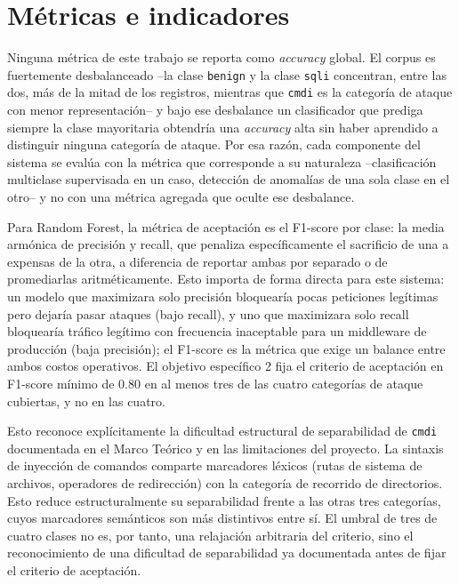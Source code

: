 \section{Métricas e indicadores}

Ninguna métrica de este trabajo se reporta como \textit{accuracy} global. El corpus es fuertemente desbalanceado --la clase \texttt{benign} y la clase \texttt{sqli} concentran, entre las dos, más de la mitad de los registros, mientras que \texttt{cmdi} es la categoría de ataque con menor representación-- y bajo ese desbalance un clasificador que prediga siempre la clase mayoritaria obtendría una \textit{accuracy} alta sin haber aprendido a distinguir ninguna categoría de ataque. Por esa razón, cada componente del sistema se evalúa con la métrica que corresponde a su naturaleza --clasificación multiclase supervisada en un caso, detección de anomalías de una sola clase en el otro-- y no con una métrica agregada que oculte ese desbalance.

Para Random Forest, la métrica de aceptación es el F1-score por clase: la media armónica de precisión y recall, que penaliza específicamente el sacrificio de una a expensas de la otra, a diferencia de reportar ambas por separado o de promediarlas aritméticamente. Esto importa de forma directa para este sistema: un modelo que maximizara solo precisión bloquearía pocas peticiones legítimas pero dejaría pasar ataques (bajo recall), y uno que maximizara solo recall bloquearía tráfico legítimo con frecuencia inaceptable para un middleware de producción (baja precisión); el F1-score es la métrica que exige un balance entre ambos costos operativos. El objetivo específico 2 fija el criterio de aceptación en F1-score mínimo de 0.80 en al menos tres de las cuatro categorías de ataque cubiertas, y no en las cuatro.

Esto reconoce explícitamente la dificultad estructural de separabilidad de \texttt{cmdi} documentada en el Marco Teórico y en las limitaciones del proyecto. La sintaxis de inyección de comandos comparte marcadores léxicos (rutas de sistema de archivos, operadores de redirección) con la categoría de recorrido de directorios. Esto reduce estructuralmente su separabilidad frente a las otras tres categorías, cuyos marcadores semánticos son más distintivos entre sí. El umbral de tres de cuatro clases no es, por tanto, una relajación arbitraria del criterio, sino el reconocimiento de una dificultad de separabilidad ya documentada antes de fijar el criterio de aceptación.

